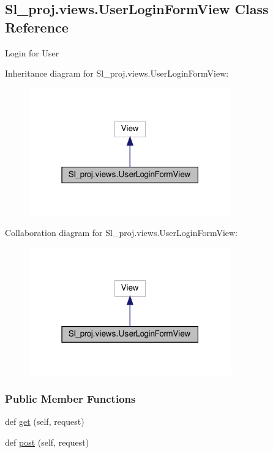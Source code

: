 \hypertarget{classSl__proj_1_1views_1_1UserLoginFormView}{}\subsection{Sl\+\_\+proj.\+views.\+User\+Login\+Form\+View Class Reference}
\label{classSl__proj_1_1views_1_1UserLoginFormView}


Login for User  




Inheritance diagram for Sl\+\_\+proj.\+views.\+User\+Login\+Form\+View\+:\nopagebreak
\begin{figure}[H]
\begin{center}
\leavevmode
\includegraphics[width=247pt]{classSl__proj_1_1views_1_1UserLoginFormView__inherit__graph}
\end{center}
\end{figure}


Collaboration diagram for Sl\+\_\+proj.\+views.\+User\+Login\+Form\+View\+:\nopagebreak
\begin{figure}[H]
\begin{center}
\leavevmode
\includegraphics[width=247pt]{classSl__proj_1_1views_1_1UserLoginFormView__coll__graph}
\end{center}
\end{figure}
\subsubsection*{Public Member Functions}
\begin{DoxyCompactItemize}
\item 
def \hyperlink{classSl__proj_1_1views_1_1UserLoginFormView_af24823ced14500cd159aa0c7a2863eac}{get} (self, request)
\item 
def \hyperlink{classSl__proj_1_1views_1_1UserLoginFormView_ae4839a4a65fe7a93bdcf1f71db891297}{post} (self, request)
\end{DoxyCompactItemize}
